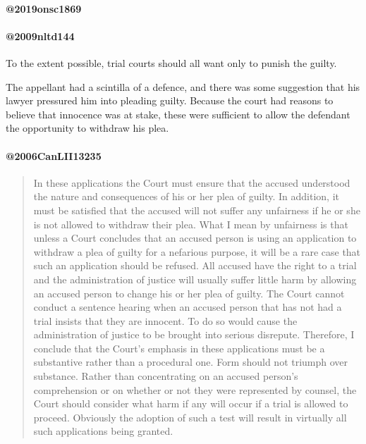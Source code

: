 \paragraph{@2019onsc1869\\}



\paragraph{@2009nltd144\\}

To the extent possible, trial courts should all want only to punish the guilty.

The appellant had a scintilla of a defence, and there was some suggestion that his lawyer pressured him into pleading guilty. Because the court had reasons to believe that innocence was at stake, these were sufficient to allow the defendant the opportunity to withdraw his plea.

\paragraph{@2006CanLII13235}

\begin{quote}
    In these applications the Court must ensure that the accused understood the nature and consequences of his or her plea of guilty. In addition, it must be satisfied that the accused will not suffer any unfairness if he or she is not allowed to withdraw their plea. What I mean by unfairness is that unless a Court concludes that an accused person is using an application to withdraw a plea of guilty for a nefarious purpose, it will be a rare case that such an application should be refused. All accused have the right to a trial and the administration of justice will usually suffer little harm by allowing an accused person to change his or her plea of guilty. The Court cannot conduct a sentence hearing when an accused person that has not had a trial insists that they are innocent. To do so would cause the administration of justice to be brought into serious disrepute. Therefore, I conclude that the Court's emphasis in these applications must be a substantive rather than a procedural one. Form should not triumph over substance. Rather than concentrating on an accused person's comprehension or on whether or not they were represented by counsel, the Court should consider what harm if any will occur if a trial is allowed to proceed. Obviously the adoption of such a test will result in virtually all such applications being granted.
\end{quote}


